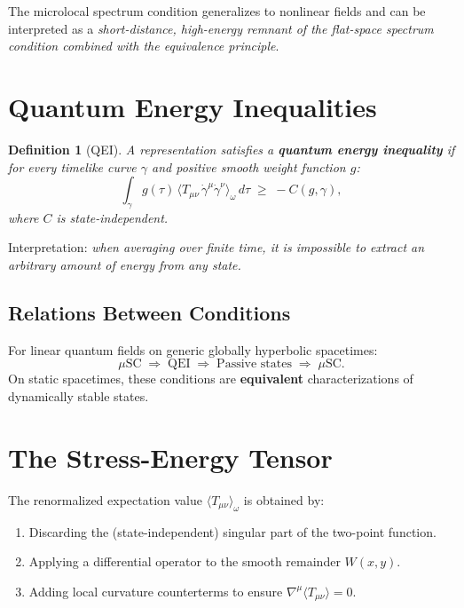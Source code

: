 \documentclass[11pt,a4paper]{article}
\newtheorem{definition}{Definition}[section]
\begin{document}
The microlocal spectrum condition generalizes to nonlinear fields
and can be interpreted as a \emph{short-distance, high-energy remnant
of the flat-space spectrum condition combined with the equivalence principle}.

\section{Quantum Energy Inequalities}

\begin{definition}[QEI]
A representation satisfies a \textbf{quantum energy inequality} if for
every timelike curve $\gamma$ and positive smooth weight function $g$:
\begin{equation}
  \int_\gamma g(\tau)\, \langle T_{\mu\nu}\, \dot{\gamma}^\mu \dot{\gamma}^\nu
  \rangle_\omega\, d\tau \;\geq\; -C(g, \gamma),
\end{equation}
where $C$ is state-independent.
\end{definition}

Interpretation: \emph{when averaging over finite time, it is impossible
to extract an arbitrary amount of energy from any state.}

\subsection{Relations Between Conditions}

For linear quantum fields on generic globally hyperbolic spacetimes:
\begin{equation}
  \text{$\mu$SC} \;\Longrightarrow\; \text{QEI}
  \;\Longrightarrow\; \text{Passive states}
  \;\Longrightarrow\; \text{$\mu$SC}.
\end{equation}
On static spacetimes, these conditions are \textbf{equivalent}
characterizations of dynamically stable states.

\section{The Stress-Energy Tensor}

The renormalized expectation value $\langle T_{\mu\nu}\rangle_\omega$
is obtained by:
\begin{enumerate}[nosep]
  \item Discarding the (state-independent) singular part of the two-point function.
  \item Applying a differential operator to the smooth remainder $W(x,y)$.
  \item Adding local curvature counterterms to ensure $\nabla^\mu \langle T_{\mu\nu}
        \rangle = 0$.
\end{enumerate}
\end{document}
